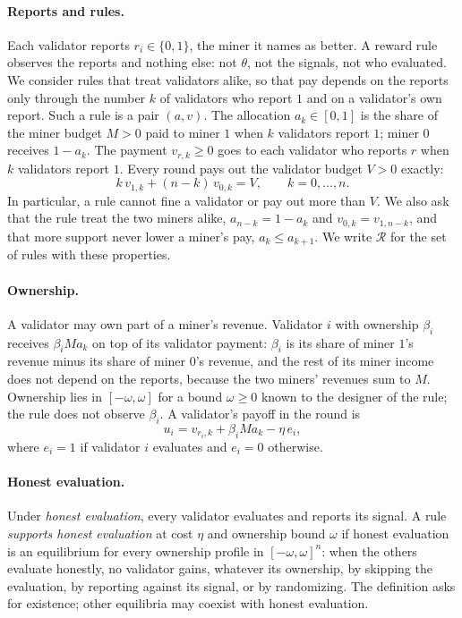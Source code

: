\documentclass[sigconf,anonymous,review]{acmart}
\numberwithin{equation}{section}
\newcommand{\Rset}{\mathcal{R}}
\begin{document}
\paragraph{Reports and rules.} Each validator reports $r_i\in\{0,1\}$, the
miner it names as better. A reward rule observes the reports and nothing else:
not $\theta$, not the signals, not who evaluated. We consider rules that treat
validators alike, so that pay depends on the reports only through the number
$k$ of validators who report $1$ and on a validator's own report. Such a rule is
a pair $(a,v)$. The allocation $a_k\in[0,1]$ is the share of the miner budget
$M>0$ paid to miner $1$ when $k$ validators report $1$; miner $0$ receives
$1-a_k$. The payment $v_{r,k}\ge0$ goes to each validator who reports $r$ when
$k$ validators report $1$. Every round pays out the validator budget $V>0$
exactly:
\begin{equation}\label{eq:budget}
k\,v_{1,k}+(n-k)\,v_{0,k}=V,\qquad k=0,\dots,n.
\end{equation}
In particular, a rule cannot fine a validator or pay out more than $V$. We also
ask that the rule treat the two miners alike, $a_{n-k}=1-a_k$ and
$v_{0,k}=v_{1,n-k}$, and that more support never lower a miner's pay,
$a_k\le a_{k+1}$. We write $\Rset$ for the set of rules with these properties.

\paragraph{Ownership.} A validator may own part of a miner's revenue.
Validator $i$ with ownership $\beta_i$ receives $\beta_iMa_k$ on top of its
validator payment: $\beta_i$ is its share of miner $1$'s revenue minus its share
of miner $0$'s revenue, and the rest of its miner income does not depend on the
reports, because the two miners' revenues sum to $M$. Ownership lies in
$[-\omega,\omega]$ for a bound $\omega\ge0$ known to the designer of the rule;
the rule does not observe $\beta_i$. A validator's payoff in the round is
\begin{equation}\label{eq:payoff}
u_i=v_{r_i,k}+\beta_iMa_k-\eta\,e_i,
\end{equation}
where $e_i=1$ if validator $i$ evaluates and $e_i=0$ otherwise.

\paragraph{Honest evaluation.} Under \emph{honest evaluation}, every validator
evaluates and reports its signal. A rule \emph{supports honest evaluation} at
cost $\eta$ and ownership bound $\omega$ if honest evaluation is an equilibrium
for every ownership profile in $[-\omega,\omega]^n$: when the others evaluate
honestly, no validator gains, whatever its ownership, by skipping the
evaluation, by reporting against its signal, or by randomizing. The definition
asks for existence; other equilibria may coexist with honest evaluation.
\end{document}
